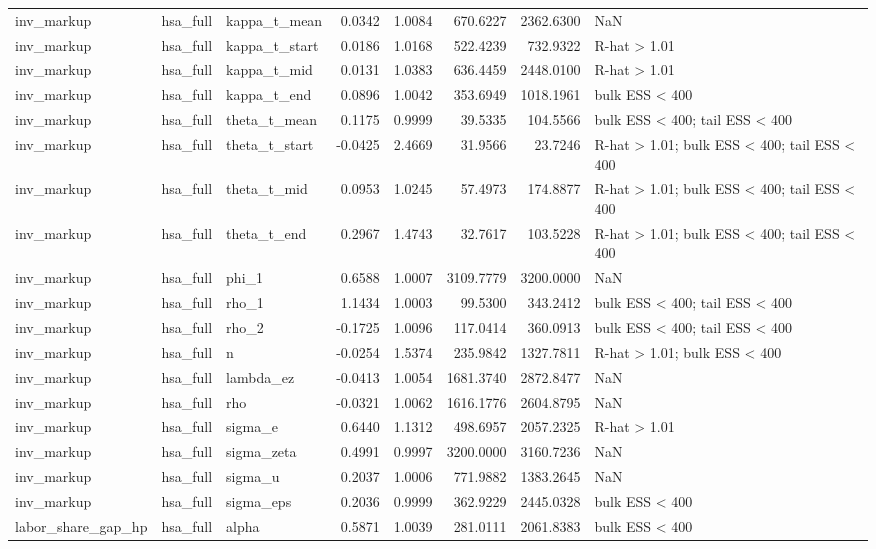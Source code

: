 \begin{tabular}{lllrrrrl}
inv\_markup & hsa\_full & kappa\_t\_mean & 0.0342 & 1.0084 & 670.6227 & 2362.6300 & NaN \\
inv\_markup & hsa\_full & kappa\_t\_start & 0.0186 & 1.0168 & 522.4239 & 732.9322 & R-hat > 1.01 \\
inv\_markup & hsa\_full & kappa\_t\_mid & 0.0131 & 1.0383 & 636.4459 & 2448.0100 & R-hat > 1.01 \\
inv\_markup & hsa\_full & kappa\_t\_end & 0.0896 & 1.0042 & 353.6949 & 1018.1961 & bulk ESS < 400 \\
inv\_markup & hsa\_full & theta\_t\_mean & 0.1175 & 0.9999 & 39.5335 & 104.5566 & bulk ESS < 400; tail ESS < 400 \\
inv\_markup & hsa\_full & theta\_t\_start & -0.0425 & 2.4669 & 31.9566 & 23.7246 & R-hat > 1.01; bulk ESS < 400; tail ESS < 400 \\
inv\_markup & hsa\_full & theta\_t\_mid & 0.0953 & 1.0245 & 57.4973 & 174.8877 & R-hat > 1.01; bulk ESS < 400; tail ESS < 400 \\
inv\_markup & hsa\_full & theta\_t\_end & 0.2967 & 1.4743 & 32.7617 & 103.5228 & R-hat > 1.01; bulk ESS < 400; tail ESS < 400 \\
inv\_markup & hsa\_full & phi\_1 & 0.6588 & 1.0007 & 3109.7779 & 3200.0000 & NaN \\
inv\_markup & hsa\_full & rho\_1 & 1.1434 & 1.0003 & 99.5300 & 343.2412 & bulk ESS < 400; tail ESS < 400 \\
inv\_markup & hsa\_full & rho\_2 & -0.1725 & 1.0096 & 117.0414 & 360.0913 & bulk ESS < 400; tail ESS < 400 \\
inv\_markup & hsa\_full & n & -0.0254 & 1.5374 & 235.9842 & 1327.7811 & R-hat > 1.01; bulk ESS < 400 \\
inv\_markup & hsa\_full & lambda\_ez & -0.0413 & 1.0054 & 1681.3740 & 2872.8477 & NaN \\
inv\_markup & hsa\_full & rho & -0.0321 & 1.0062 & 1616.1776 & 2604.8795 & NaN \\
inv\_markup & hsa\_full & sigma\_e & 0.6440 & 1.1312 & 498.6957 & 2057.2325 & R-hat > 1.01 \\
inv\_markup & hsa\_full & sigma\_zeta & 0.4991 & 0.9997 & 3200.0000 & 3160.7236 & NaN \\
inv\_markup & hsa\_full & sigma\_u & 0.2037 & 1.0006 & 771.9882 & 1383.2645 & NaN \\
inv\_markup & hsa\_full & sigma\_eps & 0.2036 & 0.9999 & 362.9229 & 2445.0328 & bulk ESS < 400 \\
labor\_share\_gap\_hp & hsa\_full & alpha & 0.5871 & 1.0039 & 281.0111 & 2061.8383 & bulk ESS < 400 \\

\end{tabular}
